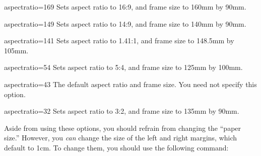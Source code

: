 \begin{classoption}{aspectratio=169}
  Sets aspect ratio to 16:9, and frame size to 160mm by 90mm.
\end{classoption}

\begin{classoption}{aspectratio=149}
  Sets aspect ratio to 14:9, and frame size to 140mm by 90mm.
\end{classoption}

\begin{classoption}{aspectratio=141}
  Sets aspect ratio to 1.41:1, and frame size to 148.5mm by 105mm.
\end{classoption}

\begin{classoption}{aspectratio=54}
  Sets aspect ratio to 5:4, and frame size to 125mm by 100mm.
\end{classoption}

\begin{classoption}{aspectratio=43}
  The default aspect ratio and frame size. You need not specify this option.
\end{classoption}

\begin{classoption}{aspectratio=32}
  Sets aspect ratio to 3:2, and frame size to 135mm by 90mm.
\end{classoption}

Aside from using these options, you should refrain from changing the ``paper size.'' However, you \emph{can} change the size of the left and right margins, which default to 1cm. To change them, you should use the following command:

